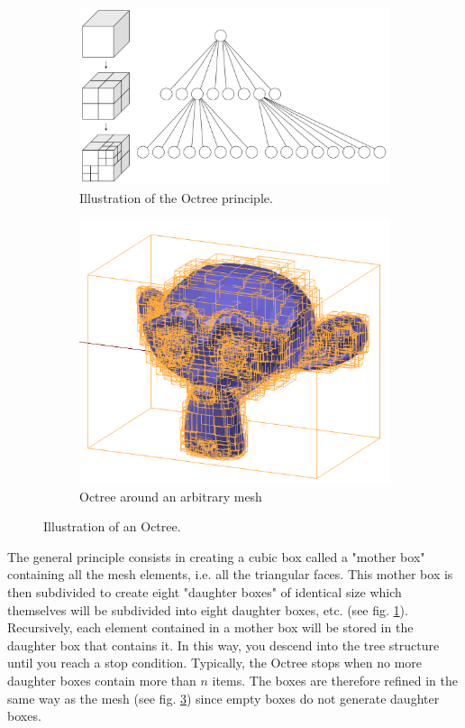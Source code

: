\documentclass[AMA,STIX1COL]{WileyNJD-v2}
\begin{document}
\begin{figure}
\centering
\begin{subfigure}{0.52\textwidth}
	\includegraphics[width=\linewidth]{octree}
	\caption{Illustration of the Octree principle.}
	\label{octree}
	\end{subfigure}
	\begin{subfigure}{0.35\textwidth}
		\includegraphics[width=\linewidth]{octreeSuzanne}
		\caption{Octree around an arbitrary mesh}
		\label{octreeSuzanne}
	\end{subfigure}
	\caption{Illustration of an Octree.}
\end{figure}

The general principle consists in creating a cubic box called a "mother box" containing all the mesh elements, i.e. all the triangular faces. This mother box is then subdivided to create eight "daughter boxes" of identical size which themselves will be subdivided into eight daughter boxes, etc. (see fig. \ref{octree}). Recursively, each element contained in a mother box will be stored in the daughter box that contains it. In this way, you descend into the tree structure until you reach a stop condition. Typically, the Octree stops when no more daughter boxes contain more than $n$ items. The boxes are therefore refined in the same way as the mesh (see fig. \ref{octreeSuzanne}) since empty boxes do not generate daughter boxes.
\end{document}
